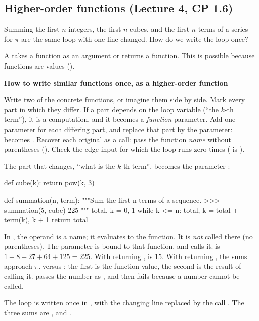 \documentclass[10pt]{scrartcl}
\newenvironment{howto}[1]{\begin{mdframed}[style=howtostyle]{\color{NavyBlue}\textbf{#1}}\par\vspace{2pt}}{\end{mdframed}}
\begin{document}
\subsection{Higher-order functions (Lecture 4, CP 1.6)}
\begin{qbox}
  Summing the first $n$ integers, the first $n$ cubes, and the first $n$ terms of a series for $\pi$ are the same loop with one line changed. How do we write the loop once?
\end{qbox}
A  takes a function as an argument or returns a function. This is possible because functions are values ().

\begin{howto}{How to write similar functions once, as a higher-order function}
\begin{steps}
  \ii Write two of the concrete functions, or imagine them side by side.
  \ii Mark every part in which they differ. If a part depends on the loop variable (``the $k$-th term''), it is a computation, and it becomes a \emph{function} parameter.
  \ii Add one parameter for each differing part, and replace that part by the parameter:  becomes .
  \ii Recover each original as a call: pass the function \emph{name} without parentheses ().
  \ii Check the edge input for which the loop runs zero times ( is ).
\end{steps}
\end{howto}

\begin{example*}
The part that changes, ``what is the $k$-th term'', becomes the parameter :
\begin{py}
def cube(k):
    return pow(k, 3)

def summation(n, term):
    """Sum the first n terms of a sequence.
    >>> summation(5, cube)
    225
    """
    total, k = 0, 1
    while k <= n:
        total, k = total + term(k), k + 1
    return total
\end{py}
\begin{itemize}
  \ii In , the operand  is a name; it evaluates to the function. It is \emph{not} called there (no parentheses). The parameter  is bound to that function, and  calls it.
  \ii {} is $1+8+27+64+125=225$. With  returning ,  is $15$. With  returning , the sums approach $\pi$.
  \ii {} versus : the first is the function value, the second is the result of calling it.  passes the number  as , and  then fails because a number cannot be called.
\end{itemize}
\end{example*}
\revisit The loop is written once in , with the changing line replaced by the call . The three sums are ,  and .
\end{document}
